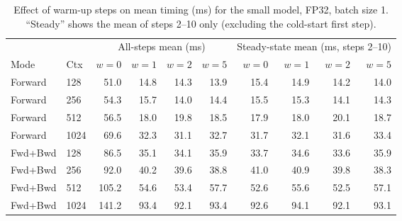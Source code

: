 \begin{table}[h!]
\centering
\caption{Effect of warm-up steps on mean timing (ms) for the small model, FP32, batch size 1. ``Steady'' shows the mean of steps 2--10 only (excluding the cold-start first step).}
\label{tab:warmup_comparison}
\begin{tabular}{ll|rrrr|rrrr}
\hline
& & \multicolumn{4}{c|}{All-steps mean (ms)} & \multicolumn{4}{c}{Steady-state mean (ms, steps 2--10)} \\
Mode & Ctx & $w{=}0$ & $w{=}1$ & $w{=}2$ & $w{=}5$ & $w{=}0$ & $w{=}1$ & $w{=}2$ & $w{=}5$ \\
\hline
	Forward & 128 & 51.0 & 14.8 & 14.3 & 13.9 & 15.4 & 14.9 & 14.2 & 14.0 \\
	Forward & 256 & 54.3 & 15.7 & 14.0 & 14.4 & 15.5 & 15.3 & 14.1 & 14.3 \\
	Forward & 512 & 56.5 & 18.0 & 19.8 & 18.5 & 17.9 & 18.0 & 20.1 & 18.7 \\
	Forward & 1024 & 69.6 & 32.3 & 31.1 & 32.7 & 31.7 & 32.1 & 31.6 & 33.4 \\
\hline
	Fwd+Bwd & 128 & 86.5 & 35.1 & 34.1 & 35.9 & 33.7 & 34.6 & 33.6 & 35.9 \\
	Fwd+Bwd & 256 & 92.0 & 40.2 & 39.6 & 38.8 & 41.0 & 40.9 & 39.8 & 38.3 \\
	Fwd+Bwd & 512 & 105.2 & 54.6 & 53.4 & 57.7 & 52.6 & 55.6 & 52.5 & 57.1 \\
	Fwd+Bwd & 1024 & 141.2 & 93.4 & 92.1 & 93.4 & 92.6 & 94.1 & 92.1 & 93.1 \\
\hline
\end{tabular}
\end{table}
